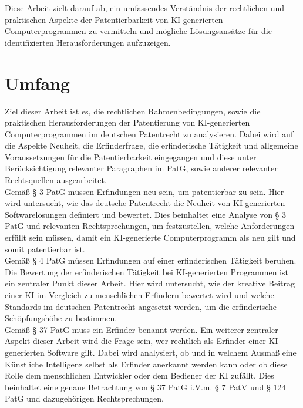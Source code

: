 Diese Arbeit zielt darauf ab, 
ein umfassendes Verständnis der rechtlichen 
und praktischen Aspekte der 
Patentierbarkeit von KI-generierten Computerprogrammen zu vermitteln 
und mögliche Lösungsansätze für die identifizierten 
Herausforderungen aufzuzeigen. 


\section{Umfang\label{sec:scope}}


Ziel dieser Arbeit ist es, 
die rechtlichen Rahmenbedingungen, 
sowie die praktischen Herausforderungen der Patentierung 
von KI-generierten Computerprogrammen im deutschen Patentrecht zu analysieren. 
Dabei wird auf die Aspekte Neuheit, die Erfinderfrage, 
die erfinderische Tätigkeit 
und allgemeine Voraussetzungen für die Patentierbarkeit eingegangen 
und diese unter Berücksichtigung relevanter Paragraphen im PatG, 
sowie anderer relevanter Rechtsquellen ausgearbeitet. 
\\



Gemäß § 3 PatG müssen Erfindungen neu sein, 
um patentierbar zu sein. 
Hier wird untersucht, 
wie das deutsche Patentrecht die 
Neuheit von KI-generierten Softwarelösungen definiert und bewertet. 
Dies beinhaltet eine Analyse von § 3 PatG und relevanten Rechtsprechungen, 
um festzustellen, 
welche Anforderungen erfüllt sein müssen, 
damit ein KI-generierte Computerprogramm als neu gilt und somit patentierbar ist. 
\\
Gemäß § 4 PatG müssen Erfindungen auf einer erfinderischen Tätigkeit beruhen. 
Die Bewertung der erfinderischen Tätigkeit 
bei KI-generierten Programmen ist ein
zentraler Punkt dieser Arbeit. Hier wird untersucht, 
wie der kreative Beitrag einer KI im Vergleich 
zu menschlichen Erfindern bewertet wird und 
welche Standards im deutschen Patentrecht angesetzt werden, 
um die erfinderische Schöpfungshöhe zu bestimmen.
\\
Gemäß § 37 PatG muss ein Erfinder benannt werden. 
Ein weiterer zentraler Aspekt dieser Arbeit wird die Frage sein, 
wer rechtlich als Erfinder einer KI-generierten Software gilt. 
Dabei wird analysiert, 
ob und in welchem Ausmaß eine Künstliche Intelligenz 
selbst als Erfinder anerkannt werden kann
oder ob diese Rolle dem menschlichen Entwickler 
oder dem Bediener der KI zufällt. 
Dies beinhaltet eine genaue Betrachtung 
von § 37 PatG i.V.m. § 7 PatV und § 124 PatG 
und dazugehörigen Rechtsprechungen.
\\


